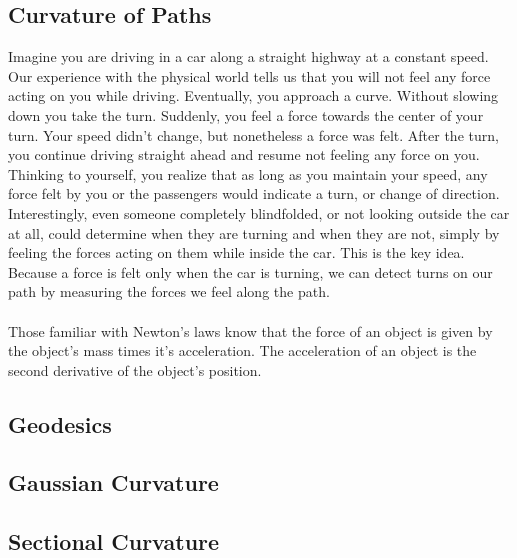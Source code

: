 \documentclass[]{article}
\newcommand\<{\ensuremath{\left\langle}}
\renewcommand\>{\ensuremath{\right\rangle}}
\theoremstyle{definition}
\theoremstyle{definition}
\begin{document}
	\subsection*{Curvature of Paths}
	Imagine you are driving in a car along a straight highway at a constant speed. Our experience with the physical world tells us that you will not feel any force acting on you while driving. Eventually, you approach a curve. Without slowing down you take the turn. Suddenly, you feel a force towards the center of your turn. Your speed didn't change, but nonetheless a force was felt. After the turn, you continue driving straight ahead and resume not feeling any force on you. Thinking to yourself, you realize that as long as you maintain your speed, any force felt by you or the passengers would indicate a turn, or change of direction. Interestingly, even someone completely blindfolded, or not looking outside the car at all, could determine when they are turning and when they are not, simply by feeling the forces acting on them while inside the car. This is the key idea. Because a force is felt only when the car is turning, we can detect turns on our path by measuring the forces we feel along the path.\\
	\\
	Those familiar with Newton's laws know that the force of an object is given by the object's mass times it's acceleration. The acceleration of an object is the second derivative of the object's position. 
	\subsection*{Geodesics}
	\subsection*{Gaussian Curvature}
	\subsection*{Sectional Curvature}
	
\end{document}
